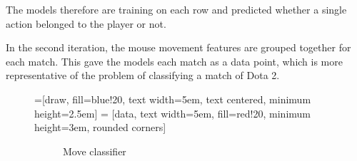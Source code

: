\documentclass[Report.tex]{subfiles}
\begin{document}
The models therefore are training on each row and predicted whether a single action belonged to the player or not.

In the second iteration, the mouse movement features are grouped together for each match. This gave the models each match as a data point, which is more representative of the problem of classifying a match of Dota 2.

\begin{figure}[H]

=[draw, fill=blue!20, text width=5em, 
    text centered, minimum height=2.5em]
 = [data, text width=5em, fill=red!20, 
    minimum height=3em, rounded corners]

\def\blockdist{3}
\newcommand{\newMoveModel}[3]{
    \node (#2-model) at (2,#3) [model] {#1 Model};
    \path (#2-model.west)+(-\blockdist,0) node (#2) [data] {#1 actions}; 
   
    \path (#2-model.east)+(\blockdist,0) node (#2-output) [data] {Predictions};
    
    \path [draw, ->] (#2.east) -- node {} (#2-model);
    \path [draw, ->] (#2-model.east) -- node{} (#2-output);
}

\newcommand{\newGameModel}[4]{
    \node (#2-model) at (2,#3) [model] {#1 Model};
    \path (#2-model.west)+(-\blockdist,0) node (#2) [data] {#4}; 
   
    \path [draw, ->] (#2.east) -- node {} (#2-model);
}
\begin{subfigure}{1\textwidth}
\centering
{}
\caption{Move classifier}
\vspace{\baselineskip}
\end{subfigure}

\hspace{\fill}

\begin{subfigure}{1\textwidth}
\centering
\def\blockdist{2}
\end{subfigure}
\end{figure}
\end{document}
